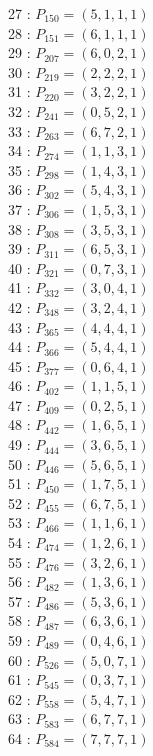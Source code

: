 \documentclass{article}
\begin{document}
{\begin{multicols}{3}
27 : $P_{150}=( 5, 1, 1, 1 )$\\
28 : $P_{151}=( 6, 1, 1, 1 )$\\
29 : $P_{207}=( 6, 0, 2, 1 )$\\
30 : $P_{219}=( 2, 2, 2, 1 )$\\
31 : $P_{220}=( 3, 2, 2, 1 )$\\
32 : $P_{241}=( 0, 5, 2, 1 )$\\
33 : $P_{263}=( 6, 7, 2, 1 )$\\
34 : $P_{274}=( 1, 1, 3, 1 )$\\
35 : $P_{298}=( 1, 4, 3, 1 )$\\
36 : $P_{302}=( 5, 4, 3, 1 )$\\
37 : $P_{306}=( 1, 5, 3, 1 )$\\
38 : $P_{308}=( 3, 5, 3, 1 )$\\
39 : $P_{311}=( 6, 5, 3, 1 )$\\
40 : $P_{321}=( 0, 7, 3, 1 )$\\
41 : $P_{332}=( 3, 0, 4, 1 )$\\
42 : $P_{348}=( 3, 2, 4, 1 )$\\
43 : $P_{365}=( 4, 4, 4, 1 )$\\
44 : $P_{366}=( 5, 4, 4, 1 )$\\
45 : $P_{377}=( 0, 6, 4, 1 )$\\
46 : $P_{402}=( 1, 1, 5, 1 )$\\
47 : $P_{409}=( 0, 2, 5, 1 )$\\
48 : $P_{442}=( 1, 6, 5, 1 )$\\
49 : $P_{444}=( 3, 6, 5, 1 )$\\
50 : $P_{446}=( 5, 6, 5, 1 )$\\
51 : $P_{450}=( 1, 7, 5, 1 )$\\
52 : $P_{455}=( 6, 7, 5, 1 )$\\
53 : $P_{466}=( 1, 1, 6, 1 )$\\
54 : $P_{474}=( 1, 2, 6, 1 )$\\
55 : $P_{476}=( 3, 2, 6, 1 )$\\
56 : $P_{482}=( 1, 3, 6, 1 )$\\
57 : $P_{486}=( 5, 3, 6, 1 )$\\
58 : $P_{487}=( 6, 3, 6, 1 )$\\
59 : $P_{489}=( 0, 4, 6, 1 )$\\
60 : $P_{526}=( 5, 0, 7, 1 )$\\
61 : $P_{545}=( 0, 3, 7, 1 )$\\
62 : $P_{558}=( 5, 4, 7, 1 )$\\
63 : $P_{583}=( 6, 7, 7, 1 )$\\
64 : $P_{584}=( 7, 7, 7, 1 )$\\
\end{multicols}


}
\end{document}
